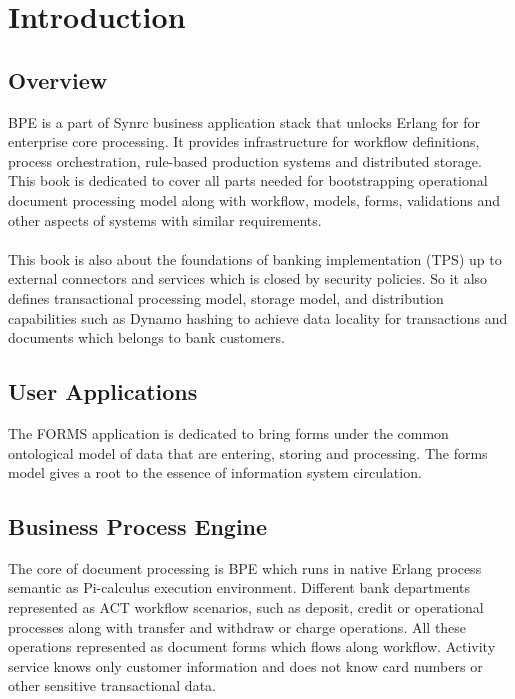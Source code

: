 \section{Introduction}

\subsection{Overview}
BPE is a part of Synrc business application stack that
unlocks Erlang for for enterprise core processing.
It provides infrastructure for workflow definitions, process orchestration,
rule-based production systems and distributed storage. This book is dedicated to cover
all parts needed for bootstrapping operational document processing model along with
workflow, models, forms, validations and other aspects of systems with similar requirements.

\paragraph{}
This book is also about the foundations of banking implementation (TPS) up to external
connectors and services which is closed by security policies. So it also defines
transactional processing model, storage model, and distribution capabilities such as
Dynamo hashing to achieve data locality for transactions and documents which
belongs to bank customers.

\subsection{User Applications}
The FORMS application is dedicated to bring forms under the common
ontological model of data that are entering, storing and processing.
The forms model gives a root to the essence of information system circulation.

\subsection{Business Process Engine}
The core of document processing is BPE which runs in native Erlang process semantic
as Pi-calculus execution environment. Different bank departments represented
as ACT workflow scenarios, such as deposit, credit or operational processes along with
transfer and withdraw or charge operations. All these operations represented
as document forms which flows along workflow. Activity service knows only
customer information and does not know card numbers or other sensitive transactional data.

